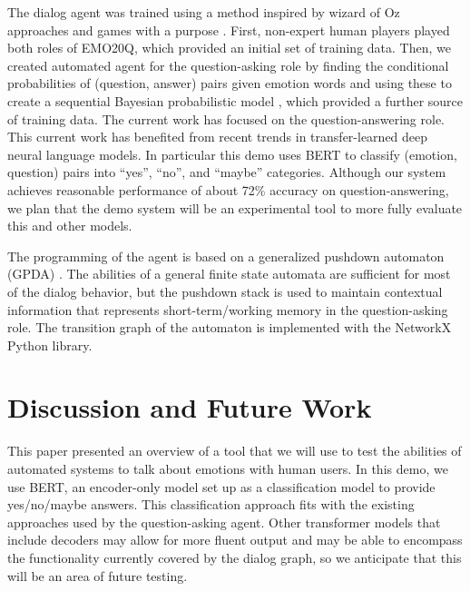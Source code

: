 \documentclass[conference]{IEEEtran}
\begin{document}
The dialog agent was trained using a method inspired by wizard of Oz
approaches \cite{Fraser1991} and games with a purpose
\cite{Ahn2004}. First, non-expert human players played both roles of
EMO20Q, which provided an initial set of training data. Then, we
created automated agent for the question-asking role by finding the
conditional probabilities of (question, answer) pairs given emotion
words and using these to create a sequential Bayesian probabilistic
model \cite{Kazemzadeh2012}, which provided a further source of
training data.  The current work has focused on the question-answering
role.  This current work has benefited from recent trends in
transfer-learned deep neural language models.  In particular
this demo uses BERT \cite{Devlin2019} to classify (emotion, question)
pairs into ``yes'', ``no'', and ``maybe'' categories. Although our
system achieves reasonable performance of about 72\% accuracy on
question-answering, we plan that the demo system will be an
experimental tool to more fully evaluate this and other models.

The programming of the agent is based on a generalized pushdown
automaton (GPDA) \cite{Allauzen2012}.  The abilities of a general
finite state automata are sufficient for most of the dialog behavior,
but the pushdown stack is used to maintain contextual information that
represents short-term/working memory in the question-asking role. The
transition graph of the automaton is implemented with the NetworkX Python
library.


\section{Discussion and Future Work}

This paper presented an overview of a tool that we will use to test
the abilities of automated systems to talk about emotions with human
users.  In this demo, we use BERT, an encoder-only model set up as a
classification model to provide yes/no/maybe answers.  This
classification approach fits with the existing approaches used by the
question-asking agent. Other transformer models that include decoders
may allow for more fluent output and may be able to encompass the
functionality currently covered by the dialog graph,  so we anticipate
that this will be an area of future testing.
\end{document}

